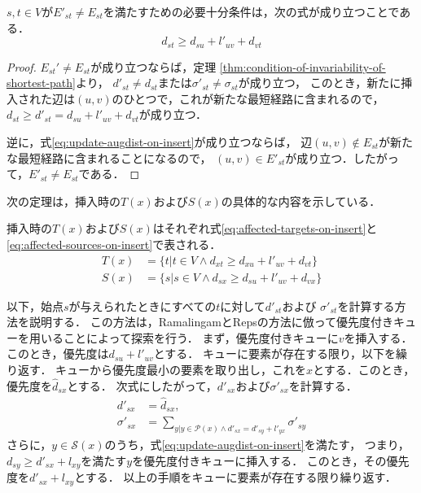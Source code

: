 \begin{lemma}
  \label{lmm:update-augdist-on-insert}
  $s,t\in V$が$E'_{st}\neq E_{st}$を満たすための必要十分条件は，次の式が成り立つことである．
  \begin{equation}
    d_{st}\geq d_{su}+l'_{uv}+d_{vt}
    \label{eq:update-augdist-on-insert}
  \end{equation}
\end{lemma}
\begin{proof}
  $E_{st}'\neq E_{st}$が成り立つならば，定理
  \ref{thm:condition-of-invariability-of-shortest-path}より，
  $d'_{st}\neq d_{st}$または$\sigma'_{st}\neq\sigma_{st}$が成り立つ，
  このとき，新たに挿入された辺は$(u,v)$のひとつで，これが新たな最短経路に含まれるので，
  $d_{st}\geq d'_{st}=d_{su}+l'_{uv}+d_{vt}$が成り立つ．

  逆に，式\eqref{eq:update-augdist-on-insert}が成り立つならば，
  辺$(u,v)\notin E_{st}$が新たな最短経路に含まれることになるので，
  $(u,v)\in E'_{st}$が成り立つ．したがって，$E'_{st}\neq E_{st}$である．
\end{proof}

次の定理は，挿入時の$T(x)$および$S(x)$の具体的な内容を示している．
\begin{theorem}
  \label{thm:affected-vertices-on-insert}
  挿入時の$T(x)$および$S(x)$はそれぞれ式\eqref{eq:affected-targets-on-insert}と
  \eqref{eq:affected-sources-on-insert}で表される．
  \begin{align}
    T(x)&=\{t|t\in V\land d_{xt}\geq d_{xu}+l'_{uv}+d_{vt}\}
    \label{eq:affected-targets-on-insert} \\
    S(x)&=\{s|s\in V\land d_{sx}\geq d_{su}+l'_{uv}+d_{vx}\}
    \label{eq:affected-sources-on-insert}
  \end{align}
\end{theorem}

以下，始点$s$が与えられたときにすべての$t$に対して$d'_{st}$および
$\sigma'_{st}$を計算する方法を説明する．
この方法は，RamalingamとRepsの方法に倣って優先度付きキューを用いることによって探索を行う．
まず，優先度付きキューに$v$を挿入する．このとき，優先度は$d_{su}+l'_{uv}$とする．
キューに要素が存在する限り，以下を繰り返す．
キューから優先度最小の要素を取り出し，これを$x$とする．このとき，
優先度を$\hat{d}_{sx}$とする．
次式にしたがって，$d'_{sx}$および$\sigma'_{sx}$を計算する．
\begin{equation*}
  \begin{aligned}
    d'_{sx}&=\hat{d}_{sx},\\
    \sigma'_{sx}&=\sum_{y|y\in\mathcal{P}(x)\land d'_{sx}=d'_{sy}+l'_{yx}}\sigma'_{sy}
  \end{aligned}
\end{equation*}
さらに，$y\in\mathcal{S}(x)$のうち，式\eqref{eq:update-augdist-on-insert}を満たす，
つまり，$d_{sy}\geq d'_{sx}+l_{xy}$を満たす$y$を優先度付きキューに挿入する．
このとき，その優先度を$d'_{sx}+l_{xy}$とする．
以上の手順をキューに要素が存在する限り繰り返す．

